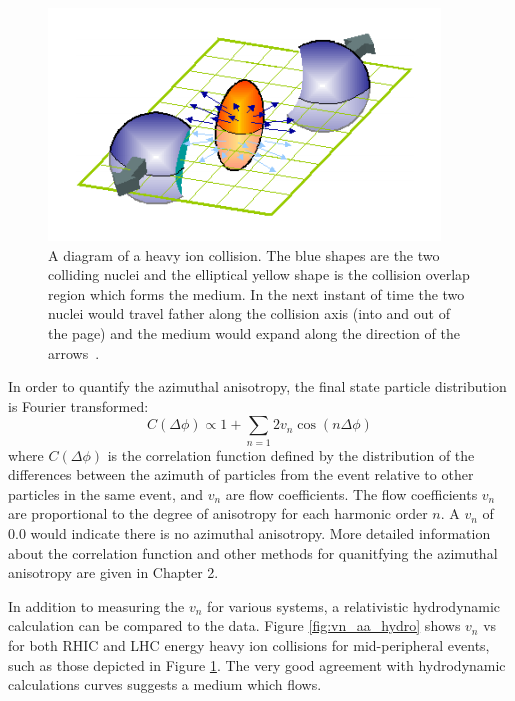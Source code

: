 \begin{figure}[!ht]
\centering
\includegraphics[width=0.5\linewidth]{figs/flow_diagram_cartoon.png}
\caption{A diagram of a heavy ion collision. The blue shapes are the two colliding nuclei and the elliptical yellow shape is the collision overlap region which forms the medium. In the next instant of time the two nuclei would travel father along the collision axis (into and out of the page) and the medium would expand along the direction of the arrows~\cite{Qin:2015nma}.}
\label{fig:flow_diagram_cart}
\end{figure}

In order to quantify the azimuthal anisotropy, the final state particle distribution is Fourier transformed:
\begin{equation}\label{eqn:dndphi}
  C(\Delta\phi) \propto 1 + \sum_{n=1}2 v_{n}\cos(n\Delta\phi) 
\end{equation}
where $C(\Delta\phi)$ is the correlation function defined by the distribution of the differences between the azimuth of particles from the event relative to other particles in the same event, and $v_n$ are flow coefficients. The flow coefficients $v_n$ are proportional to the degree of anisotropy for each harmonic order $n$. A $v_n$ of 0.0 would indicate there is no azimuthal anisotropy. More detailed information about the correlation function and other methods for quanitfying the azimuthal anisotropy are given in Chapter 2.

In addition to measuring the $v_n$ for various systems, a relativistic hydrodynamic calculation can be compared to the data. Figure \ref{fig:vn_aa_hydro} shows $v_n$ vs \pt for both RHIC and LHC energy heavy ion collisions for mid-peripheral events, such as those depicted in Figure \ref{fig:flow_diagram_cart}. The very good agreement with hydrodynamic calculations  curves suggests a medium which flows.

